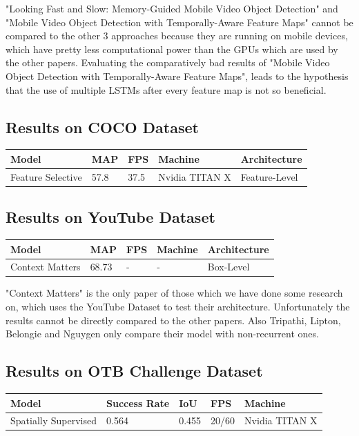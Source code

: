 \documentclass[conference]{IEEEtran}
\begin{document}
"Looking Fast and Slow: Memory-Guided Mobile Video Object Detection" and "Mobile Video Object Detection with Temporally-Aware Feature Maps" cannot be compared to the other 3 approaches because they are running on mobile devices, which have pretty less computational power than the GPUs which are used by the other papers. Evaluating the comparatively bad results of "Mobile Video Object Detection with Temporally-Aware Feature Maps", leads to the hypothesis that the use of multiple LSTMs after every feature map is not so beneficial. 

\subsection{Results on COCO Dataset}

\begin{tabular}{ | p{2cm} | p{2em}| p{2em} | p{4em} | p{5em} | } 
 \hline
 Model & MAP & FPS & Machine & Architecture \\
 \hline
 Feature Selective \cite{b6} & 57.8 & 37.5 & Nvidia TITAN X & Feature-Level \\
 \hline
\end{tabular}

\subsection{Results on YouTube Dataset}

\begin{tabular}{ | p{2cm} | p{2em}| p{2em} | p{4em} | p{5em} | } 
 \hline
 Model & MAP & FPS & Machine & Architecture \\
 \hline
 Context Matters \cite{b4} & 68.73 & - & - & Box-Level \\
 \hline
\end{tabular} \newline

"Context Matters" is the only paper of those which we have done some research on, which uses the YouTube Dataset to test their architecture. Unfortunately the results cannot be directly compared to the other papers. Also Tripathi, Lipton, Belongie and Nguygen only compare their model with non-recurrent ones. \newline

\subsection{Results on OTB Challenge Dataset}
\begin{tabular}{ | p{2cm} | p{3em}| p{2em} | p{4em} | p{4em} | } 
 \hline
 Model & Success Rate & IoU & FPS & Machine \\
 \hline
 Spatially Supervised \cite{b5} & 0.564 & 0.455 & 20/60 & Nvidia TITAN X \\
 \hline
\end{tabular} \newline
\end{document}
